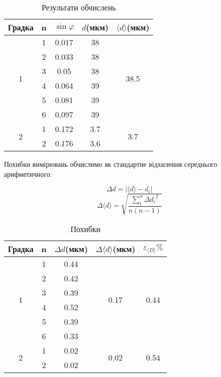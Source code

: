 \begin{table}[h]
    \centering
    \begin{tabular}{|c|c|c|c|c|}
        \hline
        \textbf{Градка} & \textbf{n} & $\sin{\varphi}$ & $d$\textbf{(мкм)} & $\langle d \rangle$\textbf{(мкм)} \\        
        \hline
        \multirow{6}{*}{1} & 1 & 0.017  & 38 & \multirow{6}{*}{38.5} \\
        \cline{2-4}
         & 2 & 0.033 & 38  & \\         	                                        
        \cline{2-4}
        & 3 & 0.05 & 38 &\\
        \cline{2-4}
        & 4 & 0.064 & 39 &\\
        \cline{2-4}
        & 5 & 0.081 & 39 &\\
        \cline{2-4}
        & 6 & 0.097 & 39 &\\
        \hline

        \multirow{2}{*}{2} & 1 & 0.172 & 3.7 & \multirow{2}{*}{3.7} \\        
        \cline{2-4}
        & 2 & 0.176 & 3.6  &\\
        \hline
    \end{tabular}

    \caption{Результати обчислень}
\end{table}

Похибки вимірювань обчислимо як стандартне відхилення
середнього арифметичного:

$$ \Delta d = |\langle d \rangle - d_i| $$
$$ \Delta \langle d \rangle = \sqrt{\frac{\sum\limits_{i}^{n} {\Delta d_i}^2}{n(n-1)}} $$

\begin{table}[h]
    \centering
    \begin{tabular}{|c|c|c|c|c|}
        \hline
        \textbf{Градка} & \textbf{n} & $\Delta d$\textbf{(мкм)} & $\Delta \langle d \rangle$\textbf{(мкм)} & $\varepsilon_{\langle D \rangle}\% $ \\        
        \hline
        \multirow{6}{*}{1} & 1 & 0.44  & \multirow{6}{*}{0.17} & \multirow{6}{*}{0.44} \\
        \cline{2-3} 
         & 2 & 0.42 &   & \\         	                                        
         \cline{2-3} 
        & 3 & 0.39 &  &\\
        \cline{2-3} 
        & 4 & 0.52 &  &\\
        \cline{2-3} 
        & 5 & 0.39 &  &\\
        \cline{2-3} 
        & 6 & 0.33 &  &\\
        \hline

        \multirow{2}{*}{2} & 1 & 0.02 & \multirow{2}{*}{0.02} & \multirow{2}{*}{0.54} \\
        \cline{2-3} 
        & 2 & 0.02 &   &\\
        \hline
    \end{tabular}

    \caption{Похибки}
\end{table}

